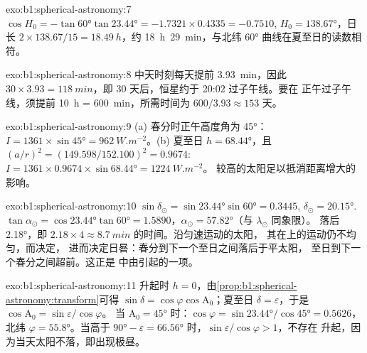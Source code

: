 \begin{solution}{exo:b1:spherical-astronomy:7}
$\cos H_0 = -\tan\ang{60}\tan\ang{23.44} = -1.7321\times0.4335 = -0.7510$,
$H_0 = \ang{138.67}$，日长 $2\times138.67/15 = \qty{18.49}{h}$，约
\qty{18}{h}~\qty{29}{min}，与北纬 \ang{60} 曲线在夏至日的读数相符。
\end{solution}

\begin{solution}{exo:b1:spherical-astronomy:8}
中天时刻每天提前 \qty{3.93}{min}，因此 $30\times3.93 =
\qty{118}{min}$，即 30 天后，恒星约于 20:02 过子午线。要在
正午过子午线，须提前 \qty{10}{h} = \qty{600}{min}，所需时间为
$600/3.93 \approx 153$ 天。
\end{solution}

\begin{solution}{exo:b1:spherical-astronomy:9}
(a) 春分时正午高度角为 \ang{45}：$I = 1361\times\sin\ang{45}
= \qty{962}{W.m^{-2}}$。(b) 夏至日 $h = \ang{68.44}$，且
$(a/r)^2 = (149.598/152.100)^2 = 0.9674$:
$I = 1361\times0.9674\times\sin\ang{68.44} = \qty{1224}{W.m^{-2}}$。
较高的太阳足以抵消距离增大的影响。
\end{solution}

\begin{solution}{exo:b1:spherical-astronomy:10}
$\sin\delta_\odot = \sin\ang{23.44}\sin\ang{60} = 0.3445$,
$\delta_\odot = \ang{20.15}$. $\tan\alpha_\odot = \cos\ang{23.44}\tan\ang{60}
= 1.5890$，$\alpha_\odot = \ang{57.82}$（与 $\lambda_\odot$ 同象限）。
落后 \ang{2.18}，即 $2.18\times4 \approx
\qty{8.7}{min}$ 的时间。沿匀速运动的太阳，
其在上的运动仍不均匀，而决定，
进而决定日晷：春分到下一个至日之间落后于平太阳，
至日到下一个春分之间超前。这正是
中由引起的一项。
\end{solution}

\begin{solution}{exo:b1:spherical-astronomy:11}
升起时 $h = 0$，由\cref{prop:b1:spherical-astronomy:transform}可得
$\sin\delta = \cos\varphi\cos\mathrm{A}_0$；夏至日
$\delta = \varepsilon$，于是 $\cos\mathrm{A}_0 = \sin\varepsilon/\cos\varphi$。
当 $\mathrm{A}_0 = \ang{45}$ 时：$\cos\varphi = \sin\ang{23.44}/\cos\ang{45} =
0.5626$，北纬 $\varphi = \ang{55.8}$。当高于 $\ang{90} - \varepsilon =
\ang{66.56}$ 时，$\sin\varepsilon/\cos\varphi > 1$，不存在
升起，因为当天太阳不落，即出现极昼。
\end{solution}

